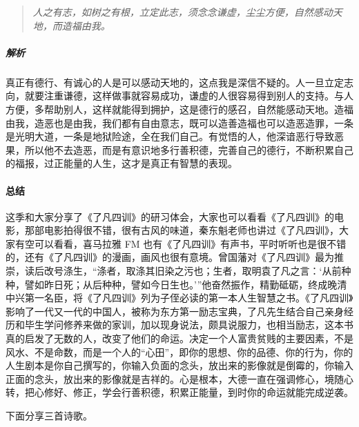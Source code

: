 \begin{quote}\it
    人之有志，如树之有根，立定此志，须念念谦虚，尘尘方便，自然感动天地，而造福由我。
\end{quote}

\subparagraph{解析} 真正有德行、有诚心的人是可以感动天地的，这点我是深信不疑的。人一旦立定志向，就要注重谦德，这样做事就容易成功，谦虚的人很容易得到别人的支持。与人方便，多帮助别人，这样就能得到拥护，这是德行的感召，自然能感动天地。造福由我，造恶也是由我，我们都有自由意志，既可以造善造福也可以造恶造罪，一条是光明大道，一条是地狱险途，全在我们自己。有觉悟的人，他深谙恶行导致恶果，所以他不去造恶，而是有意识地多行善积德，完善自己的德行，不断积累自己的福报，过正能量的人生，这才是真正有智慧的表现。

\paragraph{总结}

这季和大家分享了《了凡四训》的研习体会，大家也可以看看《了凡四训》的电影，那部电影拍得很不错，很有古风的味道，秦东魁老师也讲过《了凡四训》，大家有空可以看看，喜马拉雅 FM 也有《了凡四训》有声书，平时听听也是很不错的，还有《了凡四训》的漫画，画风也很有意境。曾国藩对《了凡四训》最为推崇，读后改号涤生，“涤者，取涤其旧染之污也；生者，取明袁了凡之言：‘从前种种，譬如昨日死；从后种种，譬如今日生也。’”他奋然振作，精勤砥砺，终成晚清中兴第一名臣，将《了凡四训》列为子侄必读的第一本人生智慧之书。《了凡四训》影响了一代又一代的中国人，被称为东方第一励志宝典，了凡先生结合自己亲身经历和毕生学问修养来做的家训，加以现身说法，颇具说服力，也相当励志，这本书真的启发了无数的人，改变了他们的命运。决定一个人富贵贫贱的主要因素，不是风水、不是命数，而是一个人的“心田”，即你的思想、你的品德、你的行为，你的人生剧本是你自己撰写的，你输入负面的念头，放出来的影像就是倒霉的，你输入正面的念头，放出来的影像就是吉祥的。心是根本，大德一直在强调修心，境随心转，把心修好、修正，学会行善积德，积累正能量，到时你的命运就能完成逆袭。

下面分享三首诗歌。


